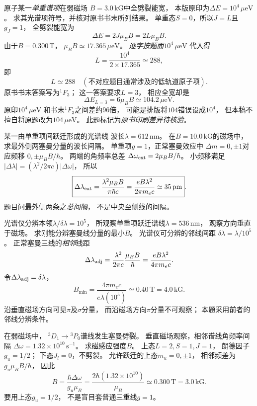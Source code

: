原子某一\emph{单重谱项}在弱磁场
$B=3.0\,\mathrm{kG}$中全劈裂能宽，
本版原印为$\Delta E=10^{4}\,\mu\mathrm{eV}$。
求其光谱项符号，并核对原书书末所列结果。
\exsolution
单重态$S=0$，所以$J=L$且$g_J=1$，
全劈裂能宽为
\[
 \Delta E=2J\mu_BB=2L\mu_BB.
\]
由于$B=0.300\,\mathrm T$，
$\mu_B B\simeq17.365\,\mu\mathrm{eV}$。
\emph{逐字按题面}$10^4\,\mu\mathrm{eV}$
代入得
\[
 L=\frac{10^4}{2\times17.365}\simeq288,
\]
即
\[
 \boxed{L\simeq288\quad
 (\text{不对应题目通常涉及的低轨道原子项})}.
\]
原书书末答案写为\({}^{1}F_3\)；
这一答案要求$L=3$，
相应全宽却是
\[
 \boxed{\Delta E_{L=3}=6\mu_BB
 \simeq104.2\,\mu\mathrm{eV}}.
\]
\excheck 原印$10^{4}\,\mu\mathrm{eV}$
和书末\({}^{1}F_3\)之间差约96倍，
可能是排版将$104$错误设成$10^4$，
但本稿不擅自将原题改为$104\,\mu\mathrm{eV}$。
此题标记为\emph{原书印刷差异待核验}。

某一由单重项间跃迁形成的光谱线
波长$\lambda=612\,\mathrm{nm}$。
在$B=10.0\,\mathrm{kG}$的磁场中，
求最外侧两塞曼分量的波长间隔。
\exsolution
单重项$g=1$，正常塞曼效应中
$\Delta m=0,\pm1$对应频移
$0,\pm\mu_B B/\hbar$。
两端的角频率总差
$\Delta\omega_{\rm ext}=2\mu_BB/\hbar$。
小频移满足
$|\Delta\lambda|=(\lambda^2/2\pi c)|\Delta\omega|$，
所以
\[
 \boxed{\Delta\lambda_{\rm ext}=
 \frac{\lambda^2\mu_B B}{\pi\hbar c}
 =\frac{eB\lambda^2}{2\pi m_ec}
 \simeq35\,\mathrm{pm}}.
\]
\excheck 题目问最外侧两条之\emph{总间隔}，
不是中央至侧线的间隔。

光谱仪分辨本领$\lambda/\delta\lambda=10^5$，
所观察单重项跃迁谱线$\lambda=536\,\mathrm{nm}$，
观察方向垂直于磁场。
求刚能分辨塞曼线分量的最小$B$。
\exsolution
光谱仪可分辨的邻线间距
$\delta\lambda=\lambda/10^5$。
正常塞曼三线的\emph{相邻}线距
\[
 \Delta\lambda_{\rm adj}
 =\frac{\lambda^2}{2\pi c}
 \frac{\mu_BB}{\hbar}
 =\frac{eB\lambda^2}{4\pi m_ec}.
\]
令$\Delta\lambda_{\rm adj}=\delta\lambda$，
\[
 \boxed{B_{\min}=
 \frac{4\pi m_ec}{e\lambda(10^5)}
 \simeq0.40\,\mathrm T=4.0\,\mathrm{kG}}.
\]
\excheck 沿垂直磁场方向可见$\pi$及$\sigma$分量，
而沿磁场方向$\pi$分量不可观察；
本题采用前者的邻线分辨条件。

在弱磁场中，
\({}^{3}D_1\to{}^{3}P_0\)谱线发生塞曼劈裂。
垂直磁场观察，相邻谱线角频率间隔
$\Delta\omega=1.32\times10^{10}\,\mathrm{s^{-1}}$。
求磁感应强度$B$。
\exsolution
上态$L=2,S=1,J=1$，
朗德因子$g_u=1/2$；
下态$J_l=0$，不劈裂。
允许跃迁的上态$m_u=0,\pm1$，
相邻频差为$g_u\mu_BB/\hbar$，
因此
\[
 \boxed{B=\frac{\hbar\Delta\omega}{g_u\mu_B}
 =\frac{2\hbar(1.32\times10^{10})}{\mu_B}
 \simeq0.300\,\mathrm T=3.0\,\mathrm{kG}}.
\]
\excheck 要用上态$g_u=1/2$，
不是盲目套普通三重线$g=1$。

